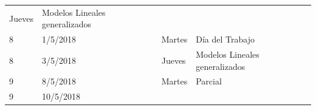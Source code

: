 \documentclass[]{book}
\theoremstyle{definition}
\theoremstyle{definition}
\theoremstyle{definition}
\theoremstyle{remark}
\begin{document}
\begin{longtable}[]{@{}llll@{}}
\begin{minipage}[t]{0.05\columnwidth}
Jueves\strut
\end{minipage} & \begin{minipage}[t]{0.71\columnwidth}\raggedright
Modelos Lineales generalizados\strut
\end{minipage}\tabularnewline
\begin{minipage}[t]{0.05\columnwidth}\raggedright
8\strut
\end{minipage} & \begin{minipage}[t]{0.07\columnwidth}\raggedright
1/5/2018\strut
\end{minipage} & \begin{minipage}[t]{0.05\columnwidth}\raggedright
Martes\strut
\end{minipage} & \begin{minipage}[t]{0.71\columnwidth}\raggedright
Día del Trabajo\strut
\end{minipage}\tabularnewline
\begin{minipage}[t]{0.05\columnwidth}\raggedright
8\strut
\end{minipage} & \begin{minipage}[t]{0.07\columnwidth}\raggedright
3/5/2018\strut
\end{minipage} & \begin{minipage}[t]{0.05\columnwidth}\raggedright
Jueves\strut
\end{minipage} & \begin{minipage}[t]{0.71\columnwidth}\raggedright
Modelos Lineales generalizados\strut
\end{minipage}\tabularnewline
\begin{minipage}[t]{0.05\columnwidth}\raggedright
9\strut
\end{minipage} & \begin{minipage}[t]{0.07\columnwidth}\raggedright
8/5/2018\strut
\end{minipage} & \begin{minipage}[t]{0.05\columnwidth}\raggedright
Martes\strut
\end{minipage} & \begin{minipage}[t]{0.71\columnwidth}\raggedright
Parcial\strut
\end{minipage}\tabularnewline
\begin{minipage}[t]{0.05\columnwidth}\raggedright
9\strut
\end{minipage} & \begin{minipage}[t]{0.07\columnwidth}\raggedright
10/5/2018\strut
\end{minipage} & \begin{minipage}[t]{0.05\columnwidth}\raggedright

\end{minipage}
\end{longtable}
\end{document}
